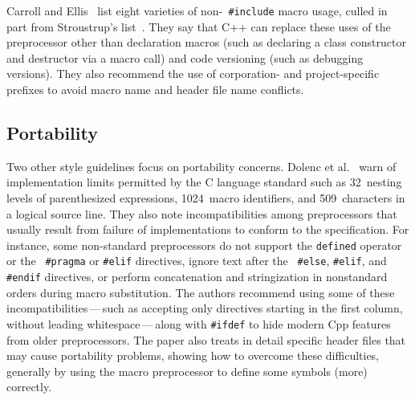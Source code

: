 \documentclass[10pt]{article}
\begin{document}
Carroll and Ellis~\cite{Carroll95} list eight varieties of non-{\tt
\#include} macro usage, culled in part from Stroustrup's
list~\cite{Stroustrup-DesignEvolution}.  They say that C++ can replace
these uses of the preprocessor other than declaration macros (such as
declaring a class constructor and destructor via a macro call) and code
versioning (such as debugging versions).  They also recommend the use of
corporation- and project-specific prefixes to avoid macro name and header
file name conflicts.


\subsection{Portability}

Two other style guidelines focus on portability concerns.
Dolenc et al.~\cite{Dolenc90} warn of implementation limits permitted by the C language standard such
as 32~nesting levels of parenthesized expressions, 1024~macro identifiers,
and 509~characters in a logical source line.  They also note
incompatibilities among preprocessors that usually result from failure of
implementations to conform to the specification.  For instance, some
non-standard preprocessors do not support the {\tt defined} operator or the {\tt
\#pragma} or {\tt \#elif} directives, ignore text after the {\tt
\#else}, {\tt \#elif}, and {\tt \#endif} directives, or perform
concatenation and stringization in nonstandard orders during macro
substitution.  The authors recommend using some of these
incompatibilities\,---\,such as accepting only directives starting in the
first column, without leading whitespace\,---\,along with {\tt \#ifdef} to
hide modern Cpp features from older preprocessors.  The paper also treats
in detail specific header files that may cause portability problems,
showing how to overcome these difficulties, generally by using
the macro preprocessor to define some symbols (more) correctly.
\end{document}

